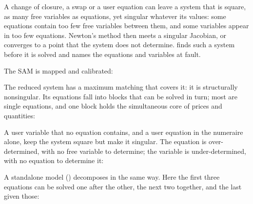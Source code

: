 
A change of closure, a swap or a user equation can leave a system that is
square, as many free variables as equations, yet singular whatever its
values: some equations contain too few free variables between them, and some
variables appear in too few equations. Newton's method then meets a singular
Jacobian, or converges to a point that the system does not determine.
 finds such a system before it is solved and names the
equations and variables at fault.

The SAM is mapped and calibrated:


The reduced system has a maximum matching that covers it: it is structurally
nonsingular. Its equations fall into blocks that can be solved in turn; most
are single equations, and one block holds the simultaneous core of prices
and quantities:


A user variable that no equation contains, and a user equation in the
numeraire alone, keep the system square but make it singular. The equation
is over-determined, with no free variable to determine; the variable is
under-determined, with no equation to determine it:


A standalone model () decomposes in the same way. Here
the first three equations can be solved one after the other, the next two
together, and the last given those:


